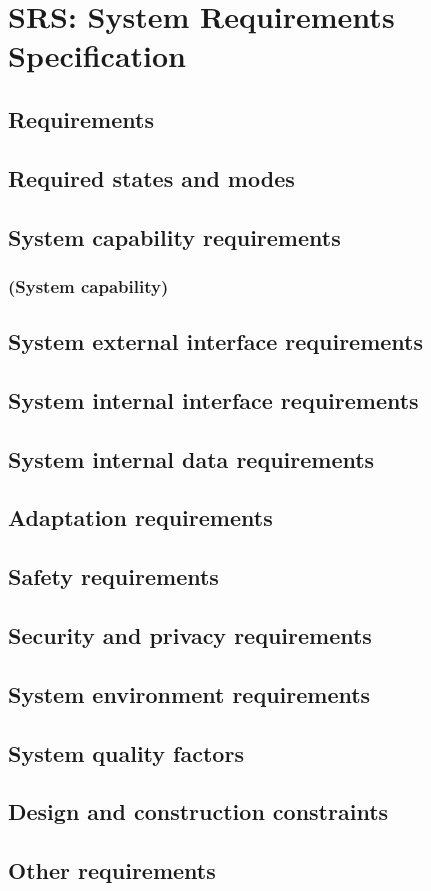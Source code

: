 \section{SRS: System Requirements Specification}

\subsection{Requirements}

\subsection{Required states and modes}

\subsection{System capability requirements}

\subsubsection{(System capability)}

\subsection{System external interface requirements}

\subsection{System internal interface requirements}

\subsection{System internal data requirements}

\subsection{Adaptation requirements}

\subsection{Safety requirements}

\subsection{Security and privacy requirements}

\subsection{System environment requirements}

\subsection{System quality factors}

\subsection{Design and construction constraints}

\subsection{Other requirements}
